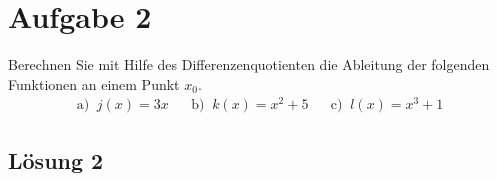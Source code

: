 \documentclass[main.tex]{subfiles}
\begin{document}
\section{Aufgabe 2}
Berechnen Sie mit Hilfe des Differenzenquotienten die Ableitung der folgenden Funktionen an einem Punkt $x_0$.
\begin{align*}
    \text{a) }\ j(x) = 3x & &
    \text{b) }\ k(x) = x^2+5 & &
    \text{c) }\ l(x) = x^3 +1
\end{align*}

\subsection{Lösung 2}
\end{document}
